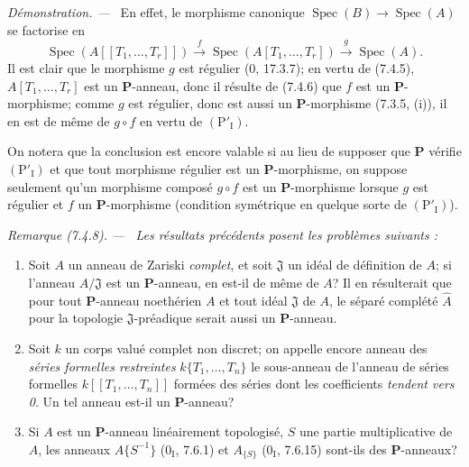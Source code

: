\documentclass[10pt,oneside]{book}
\newenvironment{remark}[1][]{%
  \par\medskip\noindent\itshape Remarque (#1). ---\ }{\par}
\newenvironment{proof}{%
  \par\medskip\noindent\textit{Démonstration. ---\ }}{\par}
\begin{document}
\begin{proof}
En effet, le morphisme canonique
$\operatorname{Spec}(B)\to\operatorname{Spec}(A)$ se factorise en
\[
\operatorname{Spec}(A[[T_1,\ldots,T_r]])
\xrightarrow{f}\operatorname{Spec}(A[T_1,\ldots,T_r])
\xrightarrow{g}\operatorname{Spec}(A).
\]
Il est clair que le morphisme $g$ est régulier (0, 17.3.7); en vertu de
(7.4.5), $A[T_1,\ldots,T_r]$ est un $\boldsymbol P$-anneau, donc il résulte
de (7.4.6) que $f$ est un $\boldsymbol P$-morphisme; comme $g$ est régulier,
donc est aussi un $\boldsymbol P$-morphisme (7.3.5, (i)), il en est de même
de $g\circ f$ en vertu de $(\mathrm P'_{\mathrm I})$.

On notera que la conclusion est encore valable si au lieu de supposer que
$\boldsymbol P$ vérifie $(\mathrm P'_{\mathrm I})$ et que tout morphisme
régulier est un $\boldsymbol P$-morphisme, on suppose seulement qu'un
morphisme composé $g\circ f$ est un $\boldsymbol P$-morphisme lorsque $g$
est régulier et $f$ un $\boldsymbol P$-morphisme (condition symétrique en
quelque sorte de $(\mathrm P'_{\mathrm I})$).
\end{proof}

\begin{remark}[7.4.8]
\label{IV.2.s7.4.8-fr}
Les résultats précédents posent les problèmes suivants :
\begin{enumerate}
\item[\emph{A)}] Soit $A$ un anneau de Zariski \emph{complet}, et soit
$\mathfrak J$ un idéal de définition de $A$; si l'anneau $A/\mathfrak J$
est un $\boldsymbol P$-anneau, en est-il de même de $A$? Il en résulterait
que pour tout $\boldsymbol P$-anneau noethérien $A$ et tout idéal
$\mathfrak J$ de $A$, le séparé complété $\widehat A$ pour la topologie
$\mathfrak J$-préadique serait aussi un $\boldsymbol P$-anneau.
\item[\emph{B)}] Soit $k$ un corps valué complet non discret; on appelle
encore anneau des \emph{séries formelles restreintes}
$k\{T_1,\ldots,T_n\}$ le sous-anneau de l'anneau de séries formelles
$k[[T_1,\ldots,T_n]]$ formées des séries dont les coefficients \emph{tendent
vers 0}. Un tel anneau est-il un $\boldsymbol P$-anneau?
\item[\emph{C)}] Si $A$ est un $\boldsymbol P$-anneau linéairement
topologisé, $S$ une partie multiplicative de $A$, les anneaux
$A\{S^{-1}\}$ (0$_{\mathrm I}$, 7.6.1) et $A_{\{S\}}$
(0$_{\mathrm I}$, 7.6.15) sont-ils des $\boldsymbol P$-anneaux?
\end{enumerate}
\end{remark}
\end{document}
